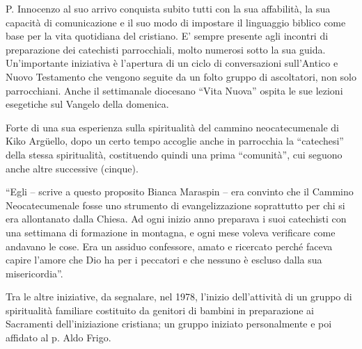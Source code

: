 P. Innocenzo al suo arrivo conquista  subito tutti con la sua affabilità,  la  sua capacità di  
comunicazione e il suo modo di impostare il linguaggio biblico come base per la vita quotidiana del 
cristiano. E’ sempre presente agli incontri di preparazione dei catechisti parrocchiali, molto 
numerosi sotto la sua guida.  Un’importante iniziativa è l’apertura di un ciclo di conversazioni 
sull’Antico e Nuovo Testamento che vengono seguite da un folto gruppo di ascoltatori, non solo 
parrocchiani. Anche il settimanale diocesano “Vita Nuova” ospita  le sue lezioni esegetiche sul 
Vangelo della domenica. 

Forte di una sua esperienza sulla spiritualità del cammino neocatecumenale di Kiko 
Argüello, dopo  un certo tempo accoglie anche in parrocchia la “catechesi” della stessa spiritualità, 
costituendo quindi una prima “comunità”, cui seguono anche altre successive (cinque). 

“Egli – scrive a questo proposito Bianca Maraspin – era convinto che il Cammino 
Neocatecumenale fosse uno strumento di evangelizzazione soprattutto per chi si era allontanato 
dalla Chiesa. Ad ogni inizio anno preparava i suoi catechisti con una settimana di formazione in 
montagna, e ogni mese voleva verificare come andavano le cose. Era un assiduo confessore, amato 
e ricercato perché faceva capire l’amore che Dio ha per i peccatori e che nessuno è escluso dalla sua 
misericordia”.

Tra le altre iniziative, da segnalare, nel 1978, l’inizio dell’attività di un gruppo di spiritualità 
familiare costituito da genitori di bambini in preparazione ai Sacramenti dell’iniziazione cristiana; 
un gruppo iniziato personalmente e poi affidato al p. Aldo Frigo. 

